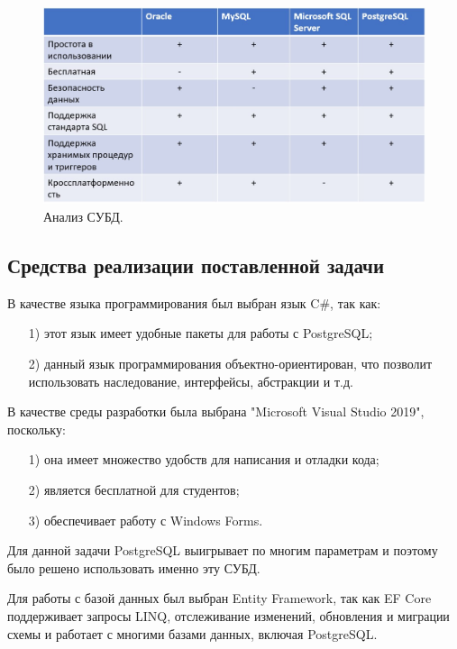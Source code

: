 \begin{figure}[h!]
	\centering
	\includegraphics[scale=0.6]{img/subd.jpg}
	\caption{Анализ СУБД.}
	\label{img:subd}
\end{figure}

\subsection{Средства реализации поставленной задачи}
В качестве языка программирования был выбран язык C\#\cite{sharp}, так как:
\begin{itemize}
	\item[1)] этот язык имеет удобные пакеты для работы с PostgreSQL;
	\item[2)] данный язык программирования объектно-ориентирован, что позволит использовать наследование, интерфейсы, абстракции и т.д.
\end{itemize}
В качестве среды разработки была выбрана "Microsoft Visual Studio 2019"\cite{vs}, поскольку:
\begin{itemize}
	\item[1)] она имеет множество удобств для написания и отладки кода;
	\item[2)] является бесплатной для студентов;
	\item[3)] обеспечивает работу с Windows Forms\cite{wf}.  
\end{itemize}
Для данной задачи PostgreSQL\cite{psql} выигрывает по многим параметрам и поэтому было решено использовать именно эту СУБД.

Для работы с базой данных был выбран Entity Framework\cite{efcore}, так как EF Core поддерживает запросы LINQ, отслеживание изменений, обновления и миграции схемы и работает с многими базами данных, включая PostgreSQL.
